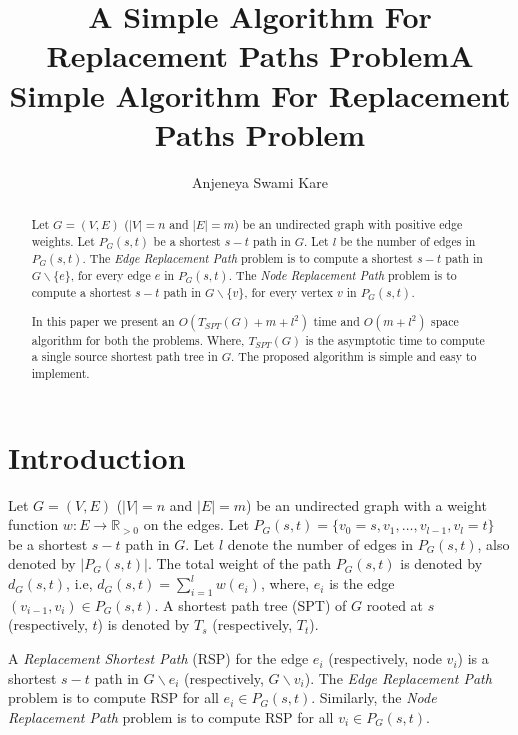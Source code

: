 \documentclass[11pt,a4paper]{llncs}
\begin{document}
\title{A Simple Algorithm For Replacement Paths Problem}
\title{A Simple Algorithm For Replacement Paths Problem}
\author{Anjeneya Swami Kare}

\maketitle
\begin{abstract}
 Let $G = (V, E)$ ($|V| = n$ and $|E| = m$) be an undirected graph with positive edge weights.
 Let $P_{G}(s, t)$ be a shortest $s-t$ path in $G$. Let $l$ be the number of edges in $P_{G}(s, t)$.
 The \emph{Edge Replacement Path}  problem is to compute a shortest $s-t$ path in $G\backslash\{e\}$, for every edge
 $e$ in $P_{G}(s, t)$. The \emph{Node Replacement Path} problem is to compute a shortest
 $s-t$ path in $G\backslash\{v\}$, for every vertex $v$ in $P_{G}(s, t)$.

 In this paper we present an $O(T_{SPT}(G)+m+l^2)$ time and $O(m+l^2)$ space algorithm
 for both the problems. Where, $T_{SPT}(G)$ is the asymptotic time to compute a single source
 shortest path tree in $G$. The proposed algorithm is simple and easy to implement.
 \end{abstract}


\section{Introduction}
Let $G = (V, E)$ ($|V| = n$ and $|E| = m$) be an undirected graph with a weight
function $w : E \rightarrow \mathbb{R}_{>0}$ on the edges.
Let $P_{G}(s, t) = \{v_{0}=s, v_{1}, \ldots , v_{l-1}, v_{l}=t\}$ be a shortest
$s-t$ path in $G$. Let $l$ denote the  number of edges in $P_{G}(s, t)$, also denoted by $|P_{G}(s, t)|$.
The total weight of the path $P_{G}(s, t)$ is denoted by $d_{G}(s, t)$,
i.e, $d_{G}(s, t) = \sum_{i = 1}^{l}{w(e_{i})}$, where, $e_{i}$ is the
edge $(v_{i-1}, v_{i}) \in P_{G}(s, t)$. A shortest path tree (SPT) of $G$ rooted at $s$ 
(respectively, $t$) is denoted by $T_{s}$ (respectively, $T_{t}$).

A \emph{Replacement Shortest Path} (RSP) for the edge $e_{i}$
(respectively, node $v_{i}$) is a shortest $s-t$ path in $G\backslash{e_{i}}$
(respectively, $G\backslash{v_{i}}$). The \emph{Edge Replacement Path} problem is to compute
RSP for all $e_{i} \in P_{G}(s, t)$. Similarly, the \emph{Node Replacement Path}
problem is to compute RSP for all $v_{i} \in P_{G}(s, t)$. 
\end{document}
